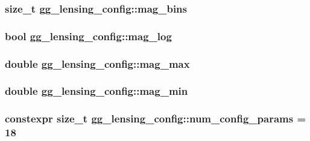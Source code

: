 \hypertarget{structgg__lensing__config_a3c82853304ede01b0697d0c05d0db1d0}{
\subsubsection[{mag\-\_\-bins}]{\setlength{\rightskip}{0pt plus 5cm}size\-\_\-t gg\-\_\-lensing\-\_\-config\-::mag\-\_\-bins}}\label{structgg__lensing__config_a3c82853304ede01b0697d0c05d0db1d0}
\hypertarget{structgg__lensing__config_aefcae2d2981313e2c3ef4f9e378d9976}{
\subsubsection[{mag\-\_\-log}]{\setlength{\rightskip}{0pt plus 5cm}bool gg\-\_\-lensing\-\_\-config\-::mag\-\_\-log}}\label{structgg__lensing__config_aefcae2d2981313e2c3ef4f9e378d9976}
\hypertarget{structgg__lensing__config_a3f234006efbd74be8b82a79ca4bda522}{
\subsubsection[{mag\-\_\-max}]{\setlength{\rightskip}{0pt plus 5cm}double gg\-\_\-lensing\-\_\-config\-::mag\-\_\-max}}\label{structgg__lensing__config_a3f234006efbd74be8b82a79ca4bda522}
\hypertarget{structgg__lensing__config_a51c75e4b7d5da1bb3dff5979131259c9}{
\subsubsection[{mag\-\_\-min}]{\setlength{\rightskip}{0pt plus 5cm}double gg\-\_\-lensing\-\_\-config\-::mag\-\_\-min}}\label{structgg__lensing__config_a51c75e4b7d5da1bb3dff5979131259c9}
\hypertarget{structgg__lensing__config_a7082cdfc7c6623985427e4c4ebb6d8e3}{
\subsubsection[{num\-\_\-config\-\_\-params}]{\setlength{\rightskip}{0pt plus 5cm}constexpr size\-\_\-t gg\-\_\-lensing\-\_\-config\-::num\-\_\-config\-\_\-params = 18\hspace{0.3cm}{\ttfamily [static]}}}\label{structgg__lensing__config_a7082cdfc7c6623985427e4c4ebb6d8e3}
